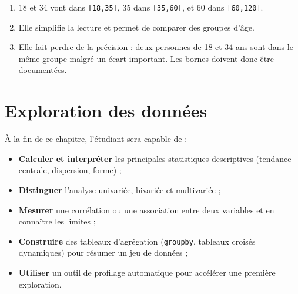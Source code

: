 \documentclass[
  french,
  letterpaper,
  open=any]{scrbook}
\providecommand{\tightlist}{%
  \setlength{\itemsep}{0pt}\setlength{\parskip}{0pt}}
\theoremstyle{definition}
\theoremstyle{definition}
\theoremstyle{remark}
\begin{document}
\begin{tcolorbox}[enhanced jigsaw, arc=.35mm, bottomrule=.15mm, bottomtitle=1mm, breakable, colback=white, colbacktitle=quarto-callout-tip-color!10!white, colframe=quarto-callout-tip-color-frame, coltitle=black, left=2mm, leftrule=.75mm, opacityback=0, opacitybacktitle=0.6, rightrule=.15mm, title=\textcolor{quarto-callout-tip-color}{\faLightbulb}\hspace{0.5em}{Solution de l'exercice Exercice~\ref{exr-prep-8}}, titlerule=0mm, toprule=.15mm, toptitle=1mm]

\begin{enumerate}
\def\labelenumi{\alph{enumi}.}
\tightlist
\item
  18 et 34 vont dans \texttt{{[}18,35{[}}, 35 dans \texttt{{[}35,60{[}},
  et 60 dans \texttt{{[}60,120{]}}.
\item
  Elle simplifie la lecture et permet de comparer des groupes d'âge.
\item
  Elle fait perdre de la précision : deux personnes de 18 et 34 ans sont
  dans le même groupe malgré un écart important. Les bornes doivent donc
  être documentées.
\end{enumerate}

\end{tcolorbox}


\chapter{Exploration des données}\label{exploration-des-donnuxe9es}

\begin{tcolorbox}[enhanced jigsaw, arc=.35mm, bottomrule=.15mm, bottomtitle=1mm, breakable, colback=white, colbacktitle=quarto-callout-tip-color!10!white, colframe=quarto-callout-tip-color-frame, coltitle=black, left=2mm, leftrule=.75mm, opacityback=0, opacitybacktitle=0.6, rightrule=.15mm, title=\textcolor{quarto-callout-tip-color}{\faLightbulb}\hspace{0.5em}{Objectifs du chapitre}, titlerule=0mm, toprule=.15mm, toptitle=1mm]

À la fin de ce chapitre, l'étudiant sera capable de :

\begin{itemize}
\tightlist
\item
  \textbf{Calculer et interpréter} les principales statistiques
  descriptives (tendance centrale, dispersion, forme) ;
\item
  \textbf{Distinguer} l'analyse univariée, bivariée et multivariée ;
\item
  \textbf{Mesurer} une corrélation ou une association entre deux
  variables et en connaître les limites ;
\item
  \textbf{Construire} des tableaux d'agrégation (\texttt{groupby},
  tableaux croisés dynamiques) pour résumer un jeu de données ;
\item
  \textbf{Utiliser} un outil de profilage automatique pour accélérer une
  première exploration.
\end{itemize}

\end{tcolorbox}
\end{document}

